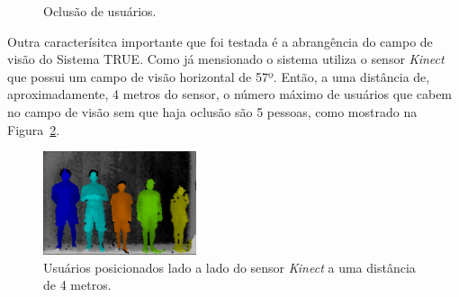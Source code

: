 		\begin{figure}[htb]
		\begin{center}
			\end{center}
			\caption{Oclusão de usuários.}
			\label{fig:testes_oclusao}
		\end{figure}

	Outra caracterísitca importante que foi testada é a abrangência do campo de
	visão do Sistema TRUE. Como já mensionado o sistema utiliza o sensor
	\textit{Kinect} que possui um campo de visão horizontal de 57º. Então, a uma
	distância de, aproximadamente, 4 metros do sensor, o número máximo de usuários
	que cabem no campo de visão sem que haja oclusão são 5 pessoas, como mostrado
	na Figura~\ref{fig:max-pessoas}.

	\begin{figure}[htb]
			\begin{center}
				\includegraphics[width=0.4\textwidth]{figuras/5.Testes/oclusao/max-pessoas.png}
			\end{center}
			\caption{Usuários posicionados lado a lado do sensor \textit{Kinect} a uma distância de 4 metros.}
			\label{fig:max-pessoas}
		\end{figure}
		
